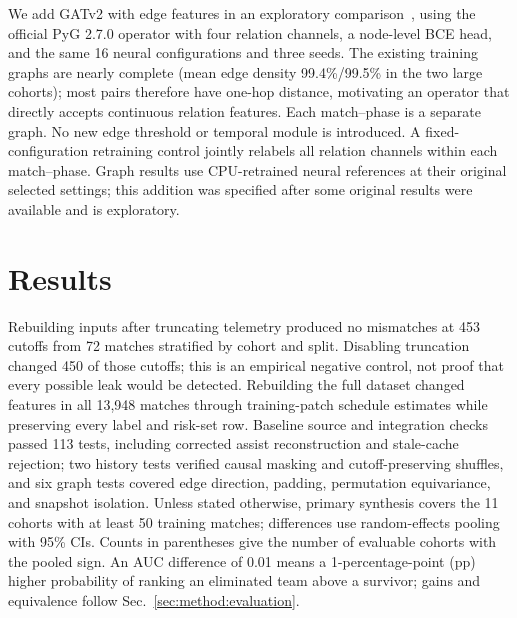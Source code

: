 \documentclass[sigconf,anonymous,nonacm]{acmart}
\begin{document}
We add GATv2 with edge features in an exploratory comparison~\cite{Brody22}, using the official PyG 2.7.0 operator with four relation channels, a node-level BCE head, and the same 16 neural configurations and three seeds. The existing training graphs are nearly complete (mean edge density 99.4\%/99.5\% in the two large cohorts); most pairs therefore have one-hop distance, motivating an operator that directly accepts continuous relation features. Each match--phase is a separate graph. No new edge threshold or temporal module is introduced. A fixed-configuration retraining control jointly relabels all relation channels within each match--phase. Graph results use CPU-retrained neural references at their original selected settings; this addition was specified after some original results were available and is exploratory.


\section{Results}
\label{sec:results}

Rebuilding inputs after truncating telemetry produced no mismatches at 453 cutoffs from 72 matches stratified by cohort and split. Disabling truncation changed 450 of those cutoffs; this is an empirical negative control, not proof that every possible leak would be detected. Rebuilding the full dataset changed features in all 13,948 matches through training-patch schedule estimates while preserving every label and risk-set row. Baseline source and integration checks passed 113 tests, including corrected assist reconstruction and stale-cache rejection; two history tests verified causal masking and cutoff-preserving shuffles, and six graph tests covered edge direction, padding, permutation equivariance, and snapshot isolation.
Unless stated otherwise, primary synthesis covers the 11 cohorts with at least 50 training matches; differences use random-effects pooling with 95\% CIs. Counts in parentheses give the number of evaluable cohorts with the pooled sign.
An AUC difference of 0.01 means a 1-percentage-point (pp) higher probability of ranking an eliminated team above a survivor; gains and equivalence follow Sec.~\ref{sec:method:evaluation}.
\end{document}

